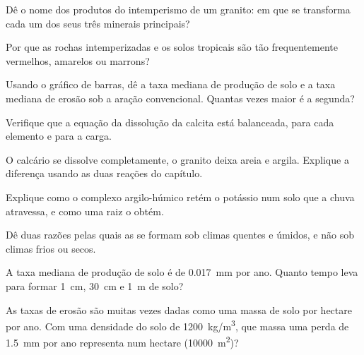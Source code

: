 \begin{exercise}[$\star$]\label{exo:g10:soil-formation:3}
Dê o nome dos produtos do intemperismo de um granito: em que se transforma
cada um dos seus três minerais principais?
\end{exercise}

\begin{exercise}[$\star$]\label{exo:g10:soil-formation:4}
Por que as rochas intemperizadas e os solos tropicais são tão frequentemente
vermelhos, amarelos ou marrons?
\end{exercise}

\begin{exercise}[$\star$]\label{exo:g10:soil-formation:5}
Usando o gráfico de barras, dê a taxa mediana de produção de solo e a taxa
mediana de erosão sob a aração convencional. Quantas vezes maior é a
segunda?
\end{exercise}

\begin{exercise}[$\star\star$]\label{exo:g10:soil-formation:6}
Verifique que a equação da dissolução da calcita está balanceada, para cada
elemento e para a carga.
\end{exercise}

\begin{exercise}[$\star\star$]\label{exo:g10:soil-formation:7}
O calcário se dissolve completamente, o granito deixa areia e argila.
Explique a diferença usando as duas reações do capítulo.
\end{exercise}

\begin{exercise}[$\star\star$]\label{exo:g10:soil-formation:8}
Explique como o complexo argilo-húmico retém o potássio num solo que a chuva
atravessa, e como uma raiz o obtém.
\end{exercise}

\begin{exercise}[$\star\star$]\label{exo:g10:soil-formation:9}
Dê duas razões pelas quais as  se formam sob climas quentes e
úmidos, e não sob climas frios ou secos.
\end{exercise}

\begin{exercise}[$\star\star$]\label{exo:g10:soil-formation:10}
A taxa mediana de produção de solo é de \qty{0.017}{mm} por ano. Quanto
tempo leva para formar \qty{1}{cm}, \qty{30}{cm} e \qty{1}{m} de solo?
\end{exercise}

\begin{exercise}[$\star\star$]\label{exo:g10:soil-formation:11}
As taxas de erosão são muitas vezes dadas como uma massa de solo por hectare
por ano. Com uma densidade do solo de \qty{1200}{kg/m^3}, que massa uma
perda de \qty{1.5}{mm} por ano representa num hectare (\qty{10000}{m^2})?
\end{exercise}

